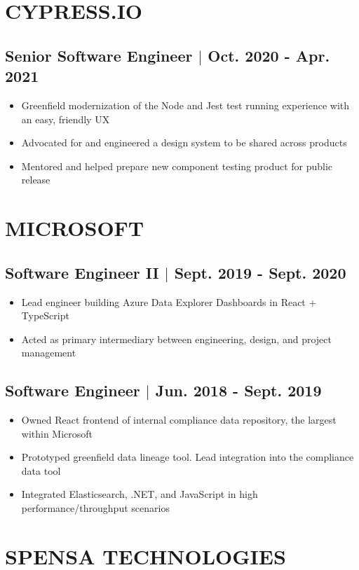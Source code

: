 \documentclass[10pt]{article}
\begin{document}
\section{CYPRESS.IO}
\subsection{Senior Software Engineer $\vert$ Oct. 2020 - Apr. 2021}
\begin{itemize}
    \item Greenfield modernization of the Node and Jest test running experience with an easy, friendly UX
    \item Advocated for and engineered a design system to be shared across products
    \item Mentored and helped prepare new component testing product for public release
\end{itemize}

\section{MICROSOFT}
\subsection{Software Engineer II $\vert$ Sept. 2019 - Sept. 2020}
\begin{itemize}
    \item Lead engineer building Azure Data Explorer Dashboards in React + TypeScript
    \item Acted as primary intermediary between engineering, design, and project management
\end{itemize}

\subsection{Software Engineer $\vert$ Jun. 2018 - Sept. 2019}
\begin{itemize}
    \item Owned React frontend of internal compliance data repository, the largest within Microsoft
    \item Prototyped greenfield data lineage tool. Lead integration into the compliance data tool
    \item Integrated Elasticsearch, .NET, and JavaScript in high performance/throughput scenarios
\end{itemize}

\section{SPENSA TECHNOLOGIES}
\end{document}
